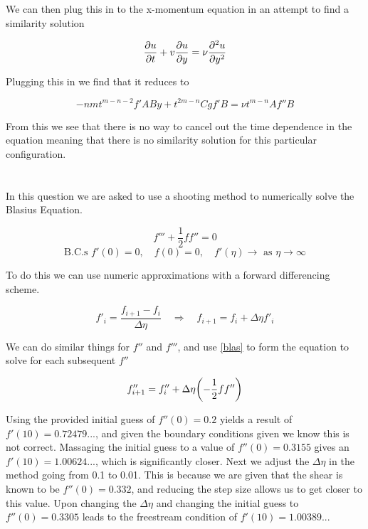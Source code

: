\documentclass{report}
\begin{document}
We can then plug this in to the x-momentum equation in an attempt to find a similarity solution

\begin{equation}
   \pdv{u}{t}+v\pdv{u}{y} = \nu\pdv[2]{u}{y}
\end{equation}

Plugging this in we find that it reduces to

\begin{equation}
   -nmt^{m-n-2}f'ABy+t^{2m-n}Cgf'B = \nu t^{m-n}Af''B
\end{equation}

From this we see that there is no way to cancel out the time dependence in the equation meaning that there is no similarity solution for this particular configuration.

\chapter{}

In this question we are asked to use a shooting method to numerically solve the Blasius Equation.

\begin{equation}
   f''' + \frac{1}{2}ff''=0
   \label{blas}
\end{equation}
\begin{equation*}
   \text{B.C.s } f'(0) = 0, \quad f(0) = 0, \quad f'(\eta) \rightarrow \text{ as } \eta\rightarrow\infty
   \label{bcs}
\end{equation*}

To do this we can use numeric approximations with a forward differencing scheme.

\begin{equation}
   f'_i = \frac{f_{i+1}-f_i}{\Delta\eta} \quad \Rightarrow \quad f_{i+1} = f_i+\Delta\eta f'_i
   \label{fpdiff}
\end{equation}

We can do similar things for $f''$ and $f'''$, and use \cref{blas} to form the equation to solve for each subsequent $f''$

\begin{equation}
   f''_{i+1} = f''_{i} + \Delta\eta\qty(-\frac{1}{2}f f'')
   \label{shooting}
\end{equation}

Using the provided initial guess of $f''(0) = 0.2$ yields a result of $f'(10) = 0.72479...$, and given the boundary conditions given we know this is not correct.
Massaging the initial guess to a value of $f''(0) = 0.3155$ gives an $f'(10)=1.00624...$, which is significantly closer.
Next we adjust the $\Delta\eta$ in the method going from 0.1 to 0.01.
This is because we are given that the shear is known to be $f''(0) = 0.332$, and reducing the step size allows us to get closer to this value.
Upon changing the $\Delta\eta$ and changing the initial guess to $f''(0) = 0.3305$ leads to the freestream condition of $f'(10)=1.00389...$
\end{document}
